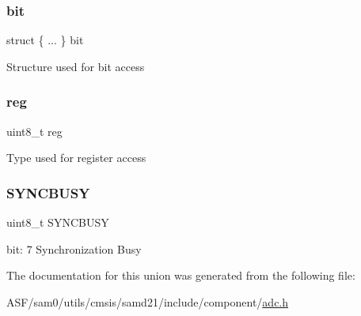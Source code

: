 \subsubsection{\texorpdfstring{bit}{bit}}
{\footnotesize\ttfamily struct \{ ... \}   bit}

Structure used for bit access \mbox{\label{union_a_d_c___s_t_a_t_u_s___type_a9428adc9af4653a2050e2536b55dec8d}} 
\subsubsection{\texorpdfstring{reg}{reg}}
{\footnotesize\ttfamily uint8\+\_\+t reg}

Type used for register access \mbox{\label{union_a_d_c___s_t_a_t_u_s___type_abb30254758e23bd24824e436a1aa8716}} 
\subsubsection{\texorpdfstring{SYNCBUSY}{SYNCBUSY}}
{\footnotesize\ttfamily uint8\+\_\+t S\+Y\+N\+C\+B\+U\+SY}

bit\+: 7 Synchronization Busy 

The documentation for this union was generated from the following file\+:\begin{DoxyCompactItemize}
\item 
A\+S\+F/sam0/utils/cmsis/samd21/include/component/\mbox{\hyperlink{component_2adc_8h}{adc.\+h}}\end{DoxyCompactItemize}

